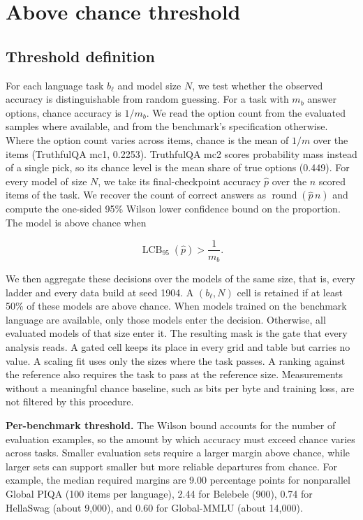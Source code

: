 \clearpage
\section{Above chance threshold}
\label{app:chance-threshold}

\subsection{Threshold definition}

For each language task $b_\ell$ and model size $N$, we test whether the observed accuracy is distinguishable from random guessing.
For a task with $m_b$ answer options, chance accuracy is $1/m_b$. We read the option count from the evaluated samples where available, and from the benchmark's specification otherwise. Where the option count varies across items, chance is the mean of $1/m$ over the items (TruthfulQA mc1, 0.2253). TruthfulQA mc2 scores probability mass instead of a single pick, so its chance level is the mean share of true options (0.449).
For every model of size $N$, we take its final-checkpoint accuracy $\hat{p}$ over the $n$ scored items of the task. We recover the count of correct answers as $\operatorname{round}(\hat{p}\,n)$ and compute the one-sided 95\% Wilson lower confidence bound on the proportion.
The model is above chance when

\[
\operatorname{LCB}_{95}(\hat{p}) > \frac{1}{m_b}.
\]

We then aggregate these decisions over the models of the same size, that is, every ladder and every data build at seed 1904.
A $(b_\ell, N)$ cell is retained if at least 50\% of these models are above chance.
When models trained on the benchmark language are available, only those models enter the decision. Otherwise, all evaluated models of that size enter it.
The resulting mask is the gate that every analysis reads. A gated cell keeps its place in every grid and table but carries no value. A scaling fit uses only the sizes where the task passes. A ranking against the reference also requires the task to pass at the reference size.
Measurements without a meaningful chance baseline, such as bits per byte and training loss, are not filtered by this procedure.

\textbf{Per-benchmark threshold.} The Wilson bound accounts for the number of evaluation examples, so the amount by which accuracy must exceed chance varies across tasks.
Smaller evaluation sets require a larger margin above chance, while larger sets can support smaller but more reliable departures from chance.
For example, the median required margins are 9.00 percentage points for nonparallel Global PIQA (100 items per language), 2.44 for Belebele (900), 0.74 for HellaSwag (about 9,000), and 0.60 for Global-MMLU (about 14,000).

